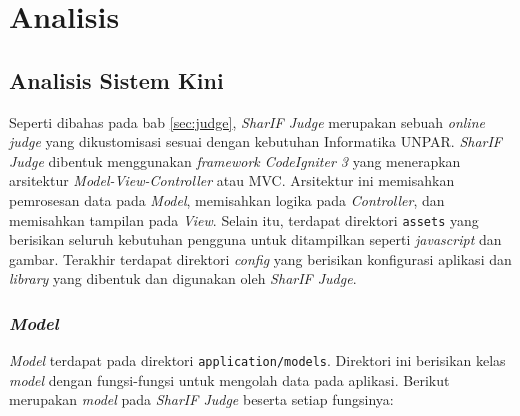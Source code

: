 \chapter{Analisis}
\label{chap:analisis}
\section{Analisis Sistem Kini}
Seperti dibahas pada bab \ref{sec:judge}, \textit{SharIF Judge} merupakan sebuah \textit{online judge} yang dikustomisasi sesuai dengan kebutuhan Informatika UNPAR. \textit{SharIF Judge} dibentuk menggunakan \textit{framework CodeIgniter 3} yang menerapkan  arsitektur \textit{Model-View-Controller} atau MVC. Arsitektur ini memisahkan pemrosesan data pada \textit{Model}, memisahkan logika pada \textit{Controller}, dan memisahkan tampilan pada \textit{View}. Selain itu, terdapat direktori \texttt{assets} yang berisikan seluruh kebutuhan pengguna untuk ditampilkan seperti \textit{javascript} dan gambar. Terakhir terdapat direktori \textit{config} yang berisikan konfigurasi aplikasi dan \textit{library} yang dibentuk dan digunakan oleh \textit{SharIF Judge}.

\subsection{\textit{Model}}
\textit{Model} terdapat pada direktori \texttt{application/models}. Direktori ini berisikan kelas \textit{model} dengan fungsi-fungsi untuk mengolah data pada aplikasi. Berikut merupakan \textit{model} pada \textit{SharIF Judge} beserta setiap fungsinya:
